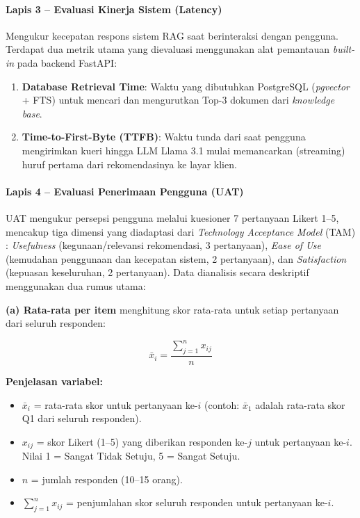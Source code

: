 \paragraph{Lapis 3 -- Evaluasi Kinerja Sistem (Latency)}
Mengukur kecepatan respons sistem RAG saat berinteraksi dengan pengguna. Terdapat dua metrik utama yang dievaluasi menggunakan alat pemantauan \textit{built-in} pada backend FastAPI:
\begin{enumerate}[noitemsep]
  \item \textbf{Database Retrieval Time}: Waktu yang dibutuhkan PostgreSQL (\textit{pgvector} + FTS) untuk mencari dan mengurutkan Top-3 dokumen dari \textit{knowledge base}.
  \item \textbf{Time-to-First-Byte (TTFB)}: Waktu tunda dari saat pengguna mengirimkan kueri hingga LLM Llama 3.1 mulai memancarkan (streaming) huruf pertama dari rekomendasinya ke layar klien.
\end{enumerate}

\paragraph{Lapis 4 -- Evaluasi Penerimaan Pengguna (UAT)}
UAT mengukur persepsi pengguna melalui kuesioner 7 pertanyaan Likert 1--5, mencakup
tiga dimensi yang diadaptasi dari \textit{Technology Acceptance Model} (TAM) \cite{Davis1989}:
\textit{Usefulness} (kegunaan/relevansi rekomendasi, 3 pertanyaan),
\textit{Ease of Use} (kemudahan penggunaan dan kecepatan sistem, 2 pertanyaan),
dan \textit{Satisfaction} (kepuasan keseluruhan, 2 pertanyaan). Data dianalisis secara deskriptif menggunakan
dua rumus utama:

\textbf{(a) Rata-rata per item} menghitung skor rata-rata untuk setiap pertanyaan
dari seluruh responden:

\begin{equation}
  \bar{x}_i = \frac{\sum_{j=1}^{n} x_{ij}}{n}
  \label{eq:mean_item}
\end{equation}

\noindent \textbf{Penjelasan variabel:}
\begin{itemize}[noitemsep]
  \item $\bar{x}_i$ = rata-rata skor untuk pertanyaan ke-$i$ (contoh: $\bar{x}_1$
    adalah rata-rata skor Q1 dari seluruh responden).
  \item $x_{ij}$ = skor Likert (1--5) yang diberikan responden ke-$j$ untuk
    pertanyaan ke-$i$. Nilai 1 = Sangat Tidak Setuju, 5 = Sangat Setuju.
  \item $n$ = jumlah responden (10--15 orang).
  \item $\sum_{j=1}^{n} x_{ij}$ = penjumlahan skor seluruh responden untuk
    pertanyaan ke-$i$.
\end{itemize}

